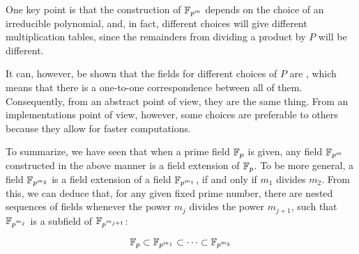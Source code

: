 One key point is that the construction of $\mathbb{F}_{p^m}$ depends on the choice of an irreducible polynomial, and, in fact, different choices will give different multiplication tables, since the remainders from dividing a product by $P$ will be different.

It can, however, be shown that the fields for different choices of $P$ are , which means that there is a one-to-one correspondence between all of them. Consequently, from an abstract point of view, they are the same thing. From an implementations point of view, however, some choices are preferable to others because they allow for faster computations.

To summarize, we have seen that when a prime field $\mathbb{F}_p$ is given, any field
$\mathbb{F}_{p^m}$ constructed in the above manner is a field extension of $\mathbb{F}_p$. To be more general, a field $\mathbb{F}_{p^{m_2}}$ is a field extension of a field $\mathbb{F}_{p^{m_1}}$, if and only if $m_1$ divides $m_2$. From this, we can deduce that, for any given fixed prime number, there are nested sequences of fields whenever the power $m_j$ divides the power $m_{j+1}$, such that $\mathbb{F}_{p^{m_j}}$ is a subfield of $\mathbb{F}_{p^{m_{j+1}}}$:

\begin{equation}
\mathbb{F}_p \subset \mathbb{F}_{p^{m_1}} \subset \cdots \subset \mathbb{F}_{p^{m_k}}
\end{equation}

